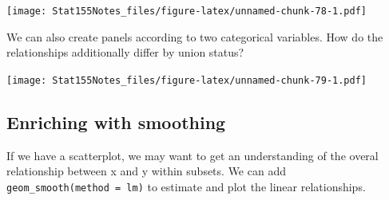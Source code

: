 \documentclass[]{book}
\newenvironment{Shaded}{\begin{snugshade}}{\end{snugshade}}
\newcommand{\DataTypeTok}[1]{\textcolor[rgb]{0.13,0.29,0.53}{#1}}
\newcommand{\KeywordTok}[1]{\textcolor[rgb]{0.13,0.29,0.53}{\textbf{#1}}}
\newcommand{\NormalTok}[1]{#1}
\newcommand{\OperatorTok}[1]{\textcolor[rgb]{0.81,0.36,0.00}{\textbf{#1}}}
\newcommand{\StringTok}[1]{\textcolor[rgb]{0.31,0.60,0.02}{#1}}
\begin{document}
\texttt{[image: Stat155Notes\_files/figure-latex/unnamed-chunk-78-1.pdf]}

We can also create panels according to two categorical variables. How do the relationships additionally differ by union status?

\begin{Shaded}
\end{Shaded}

\texttt{[image: Stat155Notes\_files/figure-latex/unnamed-chunk-79-1.pdf]}

\hypertarget{enriching-with-smoothing}{%
\subsection{Enriching with smoothing}\label{enriching-with-smoothing}}

If we have a scatterplot, we may want to get an understanding of the overal relationship between x and y within subsets. We can add \texttt{geom\_smooth(method\ =\ \textquotesingle{}lm\textquotesingle{})} to estimate and plot the linear relationships.

\begin{Shaded}
\end{Shaded}
\end{document}
